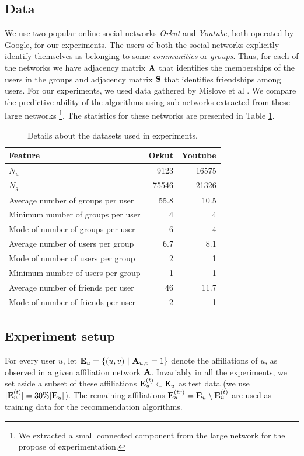 \documentclass{sig-alternate}
\begin{document}
\subsection{Data}
We use two popular online social networks \textit{Orkut} and \textit{Youtube}, both operated by Google, for our experiments. The users of both the social networks explicitly identify themselves as belonging to some \textit{communities} or \textit{groups}. Thus, for each of the networks we have adjacency matrix $\mathbf{A}$ that identifies the memberships of the users in the groups and adjacency matrix $\mathbf{S}$ that identifies friendships among users. For our experiments, we used data gathered by Mislove et al \cite{Mislove}. We compare the predictive ability of the algorithms using sub-networks extracted from these large networks \footnote{We extracted a small connected component from the large network for the propose of experimentation.}. The statistics for these networks are presented in Table \ref{tab:datasets}.

\begin{table}[h!]
\centering
\begin{tabular}{| l | r | r |} \hline
Feature & Orkut & Youtube\\ \hline
$N_{u}$ & 9123 & 16575 \\ \hline
$N_{g}$ & 75546 & 21326 \\ \hline
Average number of groups per user & 55.8 & 10.5\\ \hline
Minimum number of groups per user & 4 & 4\\ \hline
Mode of number of groups per user & 6 & 4\\ \hline
Average number of users per group & 6.7 & 8.1\\ \hline
Mode of number of users per group & 2 & 1 \\ \hline
Minimum number of users per group & 1 & 1\\ \hline
Average number of friends per user & 46 & 11.7\\ \hline
Mode of number of friends per user & 2 & 1\\ \hline
\end{tabular}
\caption{Details about the datasets used in experiments.}
\label{tab:datasets}
\end{table}

\subsection{Experiment setup}
For every user $u$, let $\mathbf{E}_u = \left\{ (u,v) \ | \ \mathbf{A}_{u,v} = 1 \right\}$ denote the affiliations of $u$, as observed in a given affiliation network $\mathbf{A}$. Invariably in all the experiments, we set aside a subset of these affiliations $\mathbf{E}_{u}^{(t)} \subset \mathbf{E}_u$ as test data (we use $|\mathbf{E}_u^{(t)}| = 30 \% |\mathbf{E}_u|$). The remaining affiliations $\mathbf{E}_u^{(tr)} = \mathbf{E}_u \setminus \mathbf{E}_u^{(t)}$ are used as training data for the recommendation algorithms.
\end{document}
